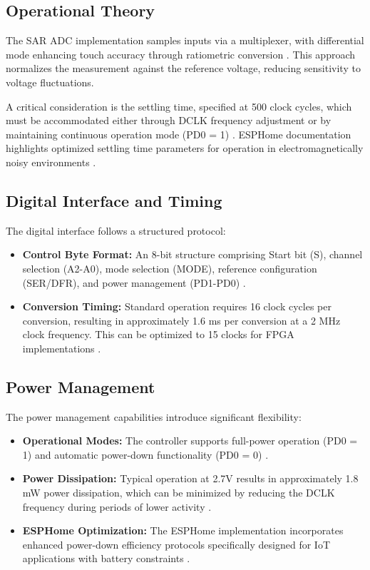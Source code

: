 \subsection{Operational Theory}
The SAR ADC implementation samples inputs via a multiplexer, with differential mode enhancing touch accuracy through ratiometric conversion \cite{ xpt2046:2007}. This approach normalizes the measurement against the reference voltage, reducing sensitivity to voltage fluctuations.

A critical consideration is the settling time, specified at 500 clock cycles, which must be accommodated either through DCLK frequency adjustment or by maintaining continuous operation mode (PD0 = 1) \cite{ xpt2046:2007}. ESPHome documentation highlights optimized settling time parameters for operation in electromagnetically noisy environments \cite{ESPHome:2024}.

\subsection{Digital Interface and Timing}
The digital interface follows a structured protocol:

\begin{itemize}
	\item \textbf{Control Byte Format:} An 8-bit structure comprising Start bit (S), channel selection (A2-A0), mode selection (MODE), reference configuration (SER/DFR), and power management (PD1-PD0) \cite{ xpt2046:2007}.
	
	\item \textbf{Conversion Timing:} Standard operation requires 16 clock cycles per conversion, resulting in approximately 1.6 ms per conversion at a 2 MHz clock frequency. This can be optimized to 15 clocks for FPGA implementations \cite{ xpt2046:2007}.
\end{itemize}

\subsection{Power Management}
The power management capabilities introduce significant flexibility:

\begin{itemize}
	\item \textbf{Operational Modes:} The controller supports full-power operation (PD0 = 1) and automatic power-down functionality (PD0 = 0) \cite{ xpt2046:2007}.
	
	\item \textbf{Power Dissipation:} Typical operation at 2.7V results in approximately 1.8 mW power dissipation, which can be minimized by reducing the DCLK frequency during periods of lower activity \cite{ xpt2046:2007}.
	
	\item \textbf{ESPHome Optimization:} The ESPHome implementation incorporates enhanced power-down efficiency protocols specifically designed for IoT applications with battery constraints \cite{ESPHome:2024}.
\end{itemize}

